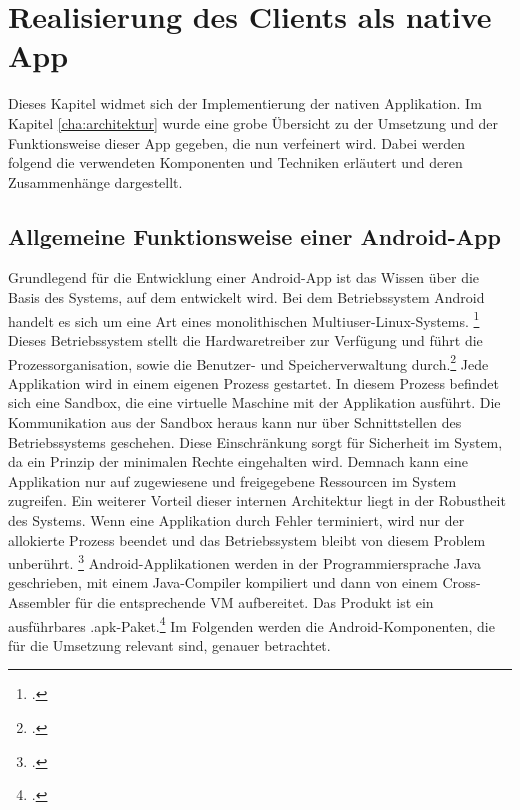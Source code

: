 \chapter{Realisierung des Clients als native App}
\label{cha:native-app}
Dieses Kapitel widmet sich der Implementierung der nativen Applikation. Im Kapitel \ref{cha:architektur} wurde eine grobe Übersicht zu der Umsetzung und der Funktionsweise dieser \gls{App} gegeben, die nun verfeinert wird.
Dabei werden folgend die verwendeten Komponenten und Techniken erläutert und deren Zusammenhänge dargestellt.
\section{Allgemeine Funktionsweise einer Android-App}
\label{sec:definition-android}
Grundlegend für die Entwicklung einer \gls{Android}-App ist das Wissen über die Basis des Systems, auf dem entwickelt wird. 
Bei dem Betriebssystem \gls{Android} handelt es sich um eine Art eines \ac{monolithisch}en Multiuser-\ac{Linux}-Systems. \footcite{Android-Fundamentals}
Dieses Betriebssystem stellt die Hardwaretreiber zur Verfügung und führt die Prozessorganisation, sowie die Benutzer- und Speicherverwaltung durch.\footcite[S. 19ff.]{Android-BeckerPant}
Jede Applikation wird in einem eigenen Prozess gestartet. In diesem Prozess befindet sich eine \ac{Sandbox}, die eine virtuelle Maschine mit der Applikation ausführt. Die Kommunikation aus der Sandbox heraus kann nur über Schnittstellen des Betriebssystems geschehen. Diese Einschränkung sorgt für Sicherheit im System, da ein Prinzip der minimalen Rechte eingehalten wird. Demnach kann eine Applikation nur auf zugewiesene und freigegebene Ressourcen im System zugreifen. Ein weiterer Vorteil dieser internen Architektur liegt in der Robustheit des Systems. Wenn eine Applikation durch Fehler terminiert, wird nur der allokierte Prozess beendet und das Betriebssystem bleibt von diesem Problem unberührt. \footcite{Android-SystemPermissions}
Android-Applikationen werden in der Programmiersprache \ac{Java} geschrieben, mit einem Java-\ac{Compiler} kompiliert und dann von einem Cross-Assembler für die entsprechende \ac{VM} aufbereitet. Das Produkt ist ein ausführbares \ac{.apk}-Paket.\footcite{Android-Fundamentals}
Im Folgenden werden die Android-Komponenten, die für die Umsetzung relevant sind, genauer betrachtet.
